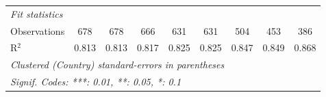 \begin{tabular}{lcccccccc}
   \midrule \emph{Fit statistics}\\
   Observations                                              & 678          & 678          & 666     & 631           & 631           & 504          & 453     & 386\\  
   R$^2$                                                     & 0.813        & 0.813        & 0.817   & 0.825         & 0.825         & 0.847        & 0.849   & 0.868\\  
   \midrule
   \multicolumn{9}{l}{\emph{Clustered (Country) standard-errors in parentheses}}\\
   \multicolumn{9}{l}{\emph{Signif. Codes: ***: 0.01, **: 0.05, *: 0.1}}\\
\end{tabular}
\par\endgroup



